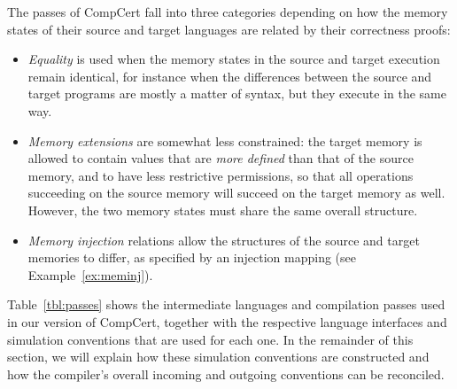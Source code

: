 \documentclass[sigplan,10pt,review,anonymous]{acmart}
\begin{document}
The passes of CompCert fall into three categories
depending on how
the memory states of their source and target languages are related
by their correctness proofs:
\begin{itemize}
\item \emph{Equality} is used when the memory states
  in the source and target execution remain identical,
  for instance when the differences between
  the source and target programs are mostly a matter of syntax,
  but they execute in the same way.
\item \emph{Memory extensions} are somewhat less constrained:
  the target memory is allowed to contain values that are
  \emph{more defined} than that of the source memory,
  and to have less restrictive permissions,
  so that all operations succeeding on the source memory
  will succeed on the target memory as well.
  However,
  the two memory states must share the same overall structure.
\item \emph{Memory injection} relations
  allow the structures of the source and target memories
  to differ, as specified by an injection mapping
  (see Example~\ref{ex:meminj}).
\end{itemize}

Table~\ref{tbl:passes} shows
the intermediate languages and compilation passes
used in our version of CompCert,
together with the respective
language interfaces and
simulation conventions
that are used for each one.
In the remainder of this section,
we will explain how these simulation conventions are constructed
and how the compiler's overall incoming and outgoing conventions
can be reconciled.
\end{document}
